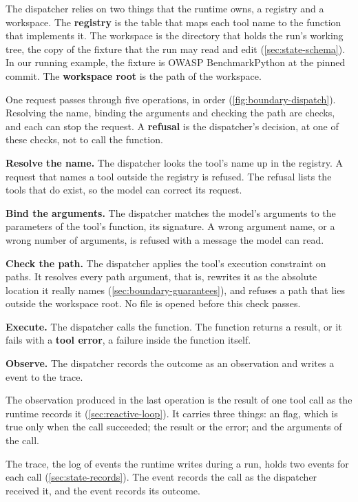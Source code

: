 The dispatcher relies on two things that the runtime owns, a registry and a workspace. The
\textbf{registry} is the table that maps each tool name to the function that implements it. The
workspace is the directory that holds the run's working tree, the copy of the fixture that the run
may read and edit (\cref{sec:state-schema}). In our running example, the fixture is OWASP
BenchmarkPython at the pinned commit. The \textbf{workspace root} is the path of the workspace.

One request passes through five operations, in order (\cref{fig:boundary-dispatch}). Resolving the
name, binding the arguments and checking the path are checks, and each can stop the request. A
\textbf{refusal} is the dispatcher's decision, at one of these checks, not to call the function.
\bi
\item \textbf{Resolve the name.} The dispatcher looks the tool's name up in the registry. A request
that names a tool outside the registry is refused. The refusal lists the tools that do exist, so the
model can correct its request.
\item \textbf{Bind the arguments.} The dispatcher matches the model's arguments to the parameters of
the tool's function, its signature. A wrong argument name, or a wrong number of arguments, is refused
with a message the model can read.
\item \textbf{Check the path.} The dispatcher applies the tool's execution constraint on paths. It
resolves every path argument, that is, rewrites it as the absolute location it really names
(\cref{sec:boundary-guarantees}), and refuses a path that lies outside the workspace root. No file is
opened before this check passes.
\item \textbf{Execute.} The dispatcher calls the function. The function returns a result, or it fails
with a \textbf{tool error}, a failure inside the function itself.
\item \textbf{Observe.} The dispatcher records the outcome as an observation and writes a
 event to the trace.
\ei

The observation produced in the last operation is the result of one tool call as the runtime records
it (\cref{sec:reactive-loop}). It carries three things: an  flag, which is true only when the
call succeeded; the result or the error; and the arguments of the call.

The trace, the log of events the runtime writes during a run, holds two events for each call
(\cref{sec:state-records}). The  event records the call as the dispatcher received
it, and the  event records its outcome.

